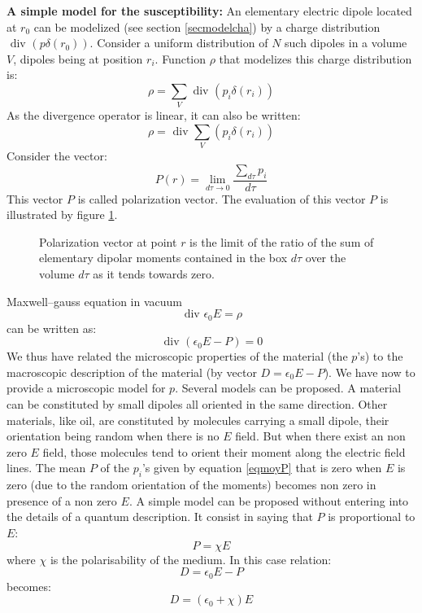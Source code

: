 \documentclass[12pt]{book}
\begin{document}
\begin{exmp}
{\bf A simple model for the susceptibility:}
An elementary electric dipole located at $r_0$ can be modelized (see section
\ref{secmodelcha}) by a charge distribution $\mbox{ div } (p\delta (r_0))$. Consider
a uniform distribution of $N$ such dipoles in a volume $V$, dipoles being at
position $r_i$. Function $\rho$ that modelizes this charge distribution is:
\begin{equation}
\rho=\sum_V \mbox{ div } (p_i\delta (r_i))
\end{equation}
As the divergence operator is linear, it can also be written:
\begin{equation}
\rho=\mbox{ div } \sum_V (p_i\delta (r_i))
\end{equation}
Consider the vector:
\begin{equation}\label{eqmoyP}
P(r)=\lim_{d\tau\rightarrow 0}\frac{\sum_{d\tau}p_i}{d\tau}
\end{equation}
This vector $P$ is called polarization vector.
The evaluation of this vector $P$ is illustrated by figure \ref{figpolar}.
\begin{figure}[htb]
 \centerline{}   
 \caption{Polarization vector at point $r$ is the limit of the ratio of the
   sum of elementary  dipolar moments contained in the box $d\tau$ over the
   volume $d\tau$ as it tends towards zero.}
 \label{figpolar}
\end{figure}
Maxwell--gauss equation in vacuum
\begin{equation}
\mbox{ div } \epsilon_0E=\rho
\end{equation}
can be written as:
\begin{equation}
\mbox{ div } (\epsilon_0E-P)=0
\end{equation}
We thus have related the microscopic properties of the material (the $p$'s) to
the macroscopic description of the material (by vector $D=\epsilon_0E-P$). We
have now to provide a microscopic model for $p$. Several models can be
proposed. A material can be constituted by small dipoles all oriented in the
same direction. Other materials, like oil, are constituted by molecules
carrying a small dipole, their orientation being random when there is no $E$
field. But when there exist an non zero $E$ field, those molecules tend to
orient their moment along the electric field lines. The mean $P$ of the
$p_i$'s given by equation \ref{eqmoyP} that is zero when $E$ is zero (due to
the random orientation of the moments) becomes non zero in presence of a non
zero $E$. A simple model can be proposed without entering into the details of
a quantum description.
It consist in saying that $P$ is proportional to $E$:
\begin{equation}
P=\chi  E
\end{equation}
where $\chi$ is the polarisability of the medium. In this case relation:
\begin{equation}
D=\epsilon_0E-P
\end{equation}
becomes:
\begin{equation}
D=(\epsilon_0+\chi )E
\end{equation}
\end{exmp}
\end{document}
